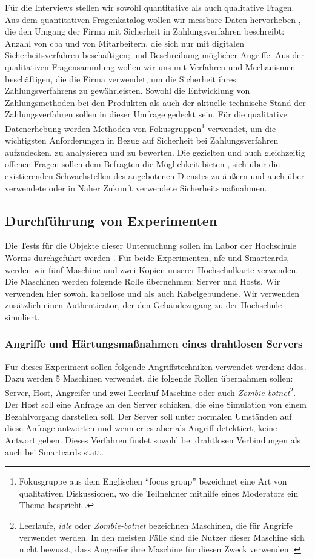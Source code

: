 Für die Interviews stellen wir sowohl quantitative als auch qualitative Fragen. Aus dem quantitativen Fragenkatalog
wollen wir messbare Daten hervorheben \cite{refbook:SRJR}, die den Umgang der Firma mit Sicherheit in Zahlungsverfahren
beschreibt: Anzahl von \acrfull{cba} und von Mitarbeitern, die sich nur mit digitalen Sicherheitsverfahren beschäftigen;
und Beschreibung möglicher Angriffe. Aus der qualitativen Fragensammlung wollen wir uns mit Verfahren 
und Mechanismen beschäftigen, die die Firma verwendet, um die Sicherheit ihres Zahlungsverfahrens zu gewährleisten. 
Sowohl die Entwicklung von Zahlungsmethoden bei den Produkten als auch der aktuelle technische Stand der Zahlungsverfahren
sollen in dieser Umfrage gedeckt sein. Für die qualitative Datenerhebung werden Methoden von Fokusgruppen\footnote{Fokusgruppe
aus dem Englischen ``focus group'' bezeichnet eine Art von qualitativen Diskussionen, wo die Teilnehmer mithilfe eines 
Moderators ein Thema bespricht \cite{refbook:APGF}.} verwendet, um die wichtigsten Anforderungen in Bezug auf Sicherheit bei 
Zahlungsverfahren aufzudecken, zu analysieren und zu bewerten. Die gezielten und auch gleichzeitig offenen Fragen sollen dem
Befragten die Möglichkeit bieten \cite{refbook:EFAF}, sich über die existierenden Schwachstellen des angebotenen
Dienstes zu äußern und auch über verwendete oder in Naher Zukunft verwendete Sicherheitsmaßnahmen.

\subsection{Durchführung von Experimenten}

Die Tests für die Objekte dieser Untersuchung sollen im Labor der Hochschule Worms durchgeführt werden \cite{refbook:FWDL}. 
Für beide Experimenten, \acrshort{nfc} und Smartcards, werden wir fünf Maschine und zwei Kopien unserer Hochschulkarte verwenden.
Die Maschinen werden folgende Rolle übernehmen: Server und Hosts. Wir verwenden hier sowohl kabellose und als auch Kabelgebundene.
Wir verwenden zusätzlich einen Authenticator, der den Gebäudezugang zu der Hochschule simuliert.


\subsubsection{Angriffe und Härtungsmaßnahmen eines drahtlosen Servers}
Für dieses Experiment sollen folgende Angriffstechniken verwendet werden: \acrfull{ddos}. Dazu werden 5 Maschinen
verwendet, die folgende Rollen übernahmen sollen: Server, Host, Angreifer und zwei Leerlauf-Maschine oder auch 
\textit{Zombie-botnet}\footnote{Leerlaufe, \textit{idle} oder \textit{Zombie-botnet} bezeichnen Maschinen, die für 
Angriffe verwendet werden. In den meisten Fälle sind die Nutzer dieser Maschine sich nicht bewusst, dass Angreifer ihre
Maschine für diesen Zweck verwenden \cite{refart:XGDD}.}. Der Host soll eine Anfrage an den Server schicken, die
eine Simulation von einem Bezahlvorgang darstellen soll. Der Server soll unter normalen Umständen auf diese Anfrage
antworten und wenn er es aber als Angriff detektiert, keine Antwort geben. Dieses Verfahren findet sowohl bei drahtlosen
Verbindungen als auch bei Smartcards statt.

